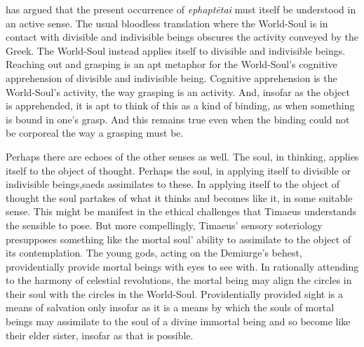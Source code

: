 \citet[134]{Betegh:2019fq} has argued that the present occurrence of \emph{ephaptētai} must itself be understood in an active sense. The usual bloodless translation where the World-Soul is in contact with divisible and indivisible beings obscures the activity conveyed by the Greek. The World-Soul instead applies itself to divisible and indivisible beings. Reaching out and grasping is an apt metaphor for the World-Soul's cognitive apprehension of divisible and indivisible being. Cognitive apprehension is the World-Soul's activity, the way grasping is an activity. And, insofar as the object is apprehended, it is apt to think of this as a kind of binding, as when something is bound in one's grasp. And this remains true even when the binding could not be corporeal the way a grasping must be. 

Perhaps there are echoes of the other senses as well. The soul, in thinking, applies itself to the object of thought. Perhaps the soul, in applying itself to divisible or indivisible beings,saeds assimilates to these. In applying itself to the object of thought the soul partakes of what it thinks and becomes like it, in some suitable sense. This might be manifest in the ethical challenges that Timaeus understands the sensible to pose. But more compellingly, Timaeus' sensory soteriology presupposes something like the mortal soul' ability to assimilate to the object of its contemplation. The young gods, acting on the Demiurge's behest, providentially provide mortal beings with eyes to see with. In rationally attending to the harmony of celestial revolutions, the mortal being may align the circles in their soul with the circles in the World-Soul. Providentially provided sight is a means of salvation only insofar as it is a means by which the souls of mortal beings may assimilate to the soul of a divine immortal being and so become like their elder sister, insofar as that is possible.

